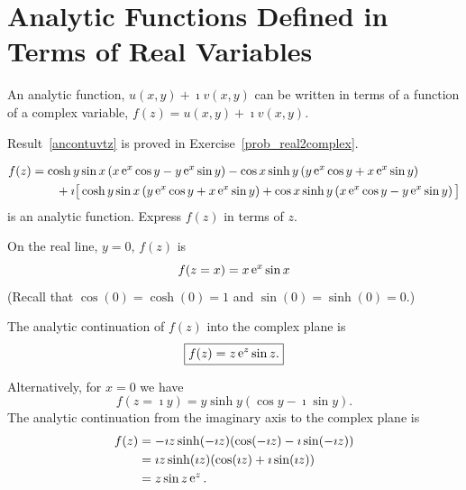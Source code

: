 \section{Analytic Functions Defined in Terms of Real Variables}







\begin{Result}
  \label{ancontuvtz}%
  An analytic function, $u(x,y) + \imath v(x,y)$ can be written in terms of a 
  function of a complex variable, $f(z) = u(x,y) + \imath v(x,y)$.
\end{Result}

Result~\ref{ancontuvtz} is proved in Exercise~\ref{prob_real2complex}.










\begin{Example}
  \begin{align*}
    f(z) &= \cosh y \sin x  \left( x \mathop{\mathrm{e}}\nolimits^x \cos y - y \mathop{\mathrm{e}}\nolimits^x \sin y \right)
    - \cos x \sinh y \left( y \mathop{\mathrm{e}}\nolimits^x \cos y + x \mathop{\mathrm{e}}\nolimits^x \sin y \right) 
    \\
    &\qquad + \imath \big[ \cosh y \sin x \left( y \mathop{\mathrm{e}}\nolimits^x \cos y 
      + x \mathop{\mathrm{e}}\nolimits^x \sin y \right)
    + \cos x \sinh y \left( x \mathop{\mathrm{e}}\nolimits^x \cos y - y \mathop{\mathrm{e}}\nolimits^x \sin y \right) \big]
  \end{align*}
  is an analytic function.
  Express $f(z)$ in terms of $z$.

  \vspace{0.1in}

  On the real line, $y = 0$, $f(z)$ is
  \[
  f(z = x) = x \mathop{\mathrm{e}}\nolimits^x \sin x
  \]
  (Recall that $\cos(0) = \cosh(0) = 1$ and $\sin(0) = \sinh(0) = 0$.)

  The analytic continuation of $f(z)$ into the complex plane is
  \[
  \boxed{ f(z) = z \mathop{\mathrm{e}}\nolimits^z \sin z. }
  \]

  Alternatively, for $x = 0$ we have
  \[
  f(z = \imath y) = y \sinh y (\cos y - \imath \sin y).
  \]
  The analytic continuation from the imaginary axis to the complex plane is
  \begin{align*}
    f(z)    
    &= -\imath z \sinh(-\imath z)  (\cos(-\imath z) - \imath \sin(-\imath z)) 
    \\
    &= \imath z \sinh(\imath z)  (\cos(\imath z) + \imath \sin(\imath z)) 
    \\
    &= z \sin z \mathop{\mathrm{e}}\nolimits^z.
  \end{align*}
\end{Example}








